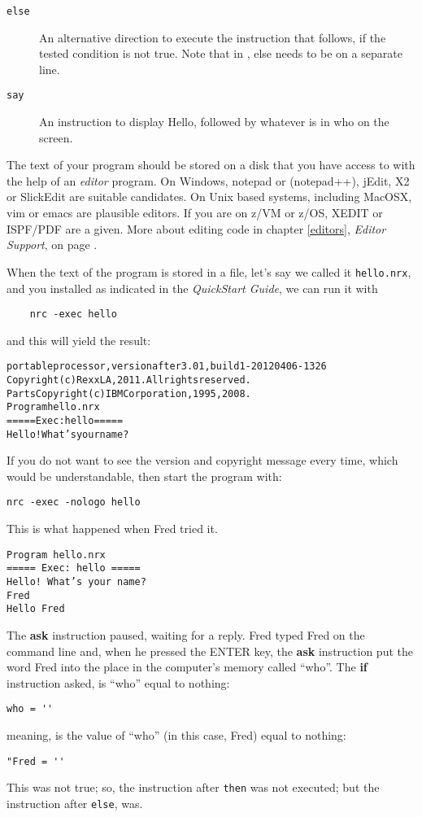 {\begin{description}
\item [\texttt{else}] An alternative direction to execute the
  instruction that follows, if the tested condition is not true. Note
  that in \nr{}, else needs to be on a separate line.
\item [\texttt{say}] An instruction to display Hello, followed by whatever is in who on the screen.
\end{description}
The text of your program should be stored on a disk that you have
access to with the help of an \emph{editor} program. On Windows,
notepad or (notepad++), jEdit, X2 or SlickEdit are suitable
candidates. On Unix based systems, including MacOSX, vim or emacs are
plausible editors. If you are on z/VM or z/OS, XEDIT or ISPF/PDF are a
given. More about editing \nr{} code in chapter \ref{editors},
\emph{Editor Support}, on page \pageref{editors}. 

When the text of the program is stored in a file, let's say we called
it \texttt{hello.nrx}, and you installed \nr{} as indicated in the
\emph{\nr{} QuickStart Guide}, we can run it with
\begin{verbatim}
    nrc -exec hello
\end{verbatim}
and this will yield the result:
\begin{alltt}
\nr{} portable processor, version \nr{} after3.01, build 1-20120406-1326
Copyright (c) RexxLA, 2011.  All rights reserved.
Parts Copyright (c) IBM Corporation, 1995,2008.
Program hello.nrx
===== Exec: hello =====
Hello! What’s your name?
\end{alltt}
If you do not want to see the version and copyright message every
time, which would be understandable, then start the program with:
\begin{verbatim}
nrc -exec -nologo hello
\end{verbatim}
This is what happened when Fred tried it.
\begin{verbatim}
Program hello.nrx
===== Exec: hello =====
Hello! What’s your name?
Fred
Hello Fred
\end{verbatim}
The \textbf{ask} instruction paused, waiting for a reply. Fred typed
Fred on the command line and, when he pressed the ENTER key, the
\textbf{ask} instruction put the word Fred into the place in the
computer's memory called ``who''. The \textbf{if} instruction asked,
is ``who'' equal to nothing:
\begin{verbatim}
who = '' 
\end{verbatim}
meaning, is the value of ``who''  (in this case, Fred) equal to
nothing:
\begin{verbatim}
"Fred = ''
\end{verbatim}
This was not true; so, the instruction after \texttt{then} was not executed; but the instruction
after \texttt{else}, was.

}
